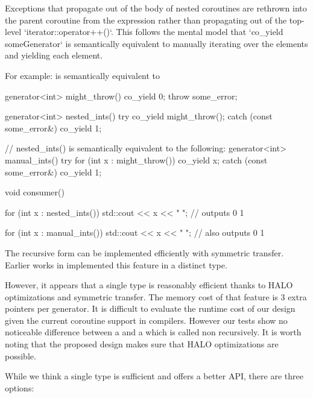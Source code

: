 \documentclass{wg21}
\begin{document}
Exceptions that propagate out of the body of nested  coroutines
are rethrown into the parent coroutine from the  expression rather
than propagating out of the top-level `iterator::operator++()`. This follows the
mental model that `co_yield someGenerator` is semantically equivalent to manually
iterating over the elements and yielding each element.

For example:  is semantically equivalent to 
\begin{colorblock}
generator<int> might_throw() {
  co_yield 0;
  throw some_error{};
}

generator<int> nested_ints() {
  try {
    co_yield might_throw();
  } catch (const some_error&) {}
  co_yield 1;
}

// nested_ints() is semantically equivalent to the following:
generator<int> manual_ints() {
  try {
    for (int x : might_throw()) {
      co_yield x;
    }
  } catch (const some_error&) {}
  co_yield 1;
}

void consumer() {
  for (int x : nested_ints()) {
    std::cout << x << " "; // outputs 0 1
  }
  
  for (int x : manual_ints()) {
    std::cout << x << " "; // also outputs 0 1
  }
}
\end{colorblock}


The recursive form can be implemented efficiently with symmetric transfer.
Earlier works in \cite{CppCoro} implemented this feature in a distinct  type.

However, it appears that a single type is reasonably efficient thanks to HALO optimizations and symmetric transfer.
The memory cost of that feature is 3 extra pointers per generator.
It is difficult to evaluate the runtime cost of our design given the current coroutine support in compilers.
However our tests show no noticeable difference between a  and a  
which is called non recursively. It is worth noting that the proposed design makes sure that HALO \cite{P0981R0} optimizations are possible.

While we think a single  type is sufficient and offers a better API, there are three options:
\end{document}
